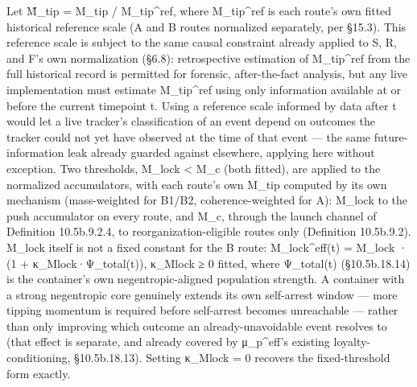 \documentclass[
]{article}
\begin{document}
Let M̃\_tip = M\_tip / M\_tip\^{}ref, where M\_tip\^{}ref is each route's
own fitted historical reference scale (A and B routes normalized
separately, per §15.3). This reference scale is subject to the same
causal constraint already applied to S, R, and F's own normalization
(§6.8): retrospective estimation of M\_tip\^{}ref from the full
historical record is permitted for forensic, after-the-fact analysis,
but any live implementation must estimate M\_tip\^{}ref using only
information available at or before the current timepoint t. Using a
reference scale informed by data after t would let a live tracker's
classification of an event depend on outcomes the tracker could not yet
have observed at the time of that event --- the same future-information
leak already guarded against elsewhere, applying here without exception.
Two thresholds, M\_lock \textless{} M\_c (both fitted), are applied to
the normalized accumulators, with each route's own M\_tip computed by
its own mechanism (mass-weighted for B1/B2, coherence-weighted for A):
M\_lock to the push accumulator on every route, and M\_c, through the
launch channel of Definition 10.5b.9.2.4, to reorganization-eligible
routes only (Definition 10.5b.9.2). M\_lock itself is not a fixed
constant for the B route: M\_lock\^{}eff(t) = M\_lock · (1 +
κ\_Mlock·Ψ\_total(t)), κ\_Mlock ≥ 0 fitted, where Ψ\_total(t)
(§10.5b.18.14) is the container's own negentropic-aligned population
strength. A container with a strong negentropic core genuinely extends
its own self-arrest window --- more tipping momentum is required before
self-arrest becomes unreachable --- rather than only improving which
outcome an already-unavoidable event resolves to (that effect is
separate, and already covered by μ\_p\^{}eff's existing
loyalty-conditioning, §10.5b.18.13). Setting κ\_Mlock = 0 recovers the
fixed-threshold form exactly.
\end{document}
